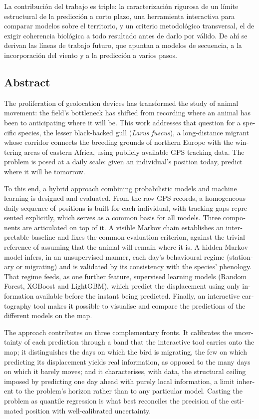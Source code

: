 La contribución del trabajo es triple: la caracterización rigurosa de un límite
estructural de la predicción a corto plazo, una herramienta interactiva para comparar
modelos sobre el territorio, y un criterio metodológico transversal, el de exigir
coherencia biológica a todo resultado antes de darlo por válido. De ahí se derivan las
líneas de trabajo futuro, que apuntan a modelos de secuencia, a la incorporación del
viento y a la predicción a varios pasos.

\begin{otherlanguage}{english}
  \chapter*{Abstract}

  The proliferation of geolocation devices has transformed the study of animal
  movement: the field's bottleneck has shifted from recording where an animal has
  been to anticipating where it will be. This work addresses that question for a
  specific species, the lesser black-backed gull (\textit{Larus fuscus}), a
  long-distance migrant whose corridor connects the breeding grounds of northern
  Europe with the wintering areas of eastern Africa, using publicly available GPS
  tracking data. The problem is posed at a daily scale: given an individual's
  position today, predict where it will be tomorrow.

  To this end, a hybrid approach combining probabilistic models and machine learning
  is designed and evaluated. From the raw GPS records, a homogeneous daily sequence of
  positions is built for each individual, with tracking gaps represented explicitly,
  which serves as a common basis for all models. Three components are articulated on
  top of it. A visible Markov chain establishes an interpretable baseline and fixes
  the common evaluation criterion, against the trivial reference of assuming that the
  animal will remain where it is. A hidden Markov model infers, in an unsupervised
  manner, each day's behavioural regime (stationary or migrating) and is validated by
  its consistency with the species' phenology. That regime feeds, as one further
  feature, supervised learning models (Random Forest, XGBoost and LightGBM), which
  predict the displacement using only information available before the instant being
  predicted. Finally, an interactive cartography tool makes it possible to visualise
  and compare the predictions of the different models on the map.

  The approach contributes on three complementary fronts. It calibrates the
  uncertainty of each prediction through a band that the interactive tool carries onto
  the map; it distinguishes the days on which the bird is migrating, the few on which
  predicting its displacement yields real information, as opposed to the many days
  on which it barely moves; and it characterises, with data, the structural
  ceiling imposed by predicting one day ahead with purely local information, a limit
  inherent to the problem's horizon rather than to any particular model. Casting the
  problem as quantile regression is what best reconciles the precision of the
  estimated position with well-calibrated uncertainty.


\end{otherlanguage}
